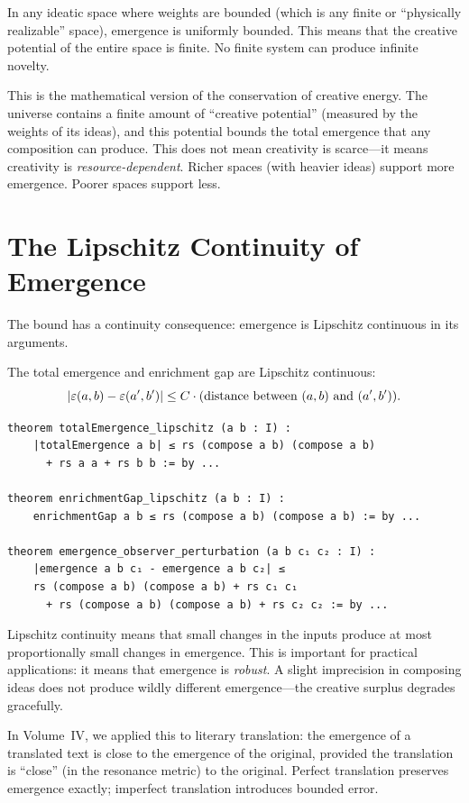 \begin{interpretation}
In any ideatic space where weights are bounded (which is any finite or
``physically realizable'' space), emergence is uniformly bounded. This means
that the creative potential of the entire space is finite. No finite system
can produce infinite novelty.

This is the mathematical version of the conservation of creative energy.
The universe contains a finite amount of ``creative potential'' (measured by
the weights of its ideas), and this potential bounds the total emergence that
any composition can produce. This does not mean creativity is scarce---it means
creativity is \emph{resource-dependent}. Richer spaces (with heavier ideas)
support more emergence. Poorer spaces support less.
\end{interpretation}


\section{The Lipschitz Continuity of Emergence}

The bound has a continuity consequence: emergence is Lipschitz continuous in
its arguments.

\begin{theorem}
\label{thm:lipschitz}
The total emergence and enrichment gap are Lipschitz continuous:
\[
  |\varepsilon(a,b) - \varepsilon(a',b')| \leq C \cdot (\text{distance between } (a,b) \text{ and } (a',b')).
\]
\end{theorem}

\begin{lstlisting}[caption={Lipschitz continuity (IDT\_v3\_Emergence.lean)}]
theorem totalEmergence_lipschitz (a b : I) :
    |totalEmergence a b| ≤ rs (compose a b) (compose a b)
      + rs a a + rs b b := by ...

theorem enrichmentGap_lipschitz (a b : I) :
    enrichmentGap a b ≤ rs (compose a b) (compose a b) := by ...

theorem emergence_observer_perturbation (a b c₁ c₂ : I) :
    |emergence a b c₁ - emergence a b c₂| ≤
    rs (compose a b) (compose a b) + rs c₁ c₁
      + rs (compose a b) (compose a b) + rs c₂ c₂ := by ...
\end{lstlisting}

\begin{interpretation}
Lipschitz continuity means that small changes in the inputs produce at most
proportionally small changes in emergence. This is important for practical
applications: it means that emergence is \emph{robust}. A slight imprecision
in composing ideas does not produce wildly different emergence---the creative
surplus degrades gracefully.

In Volume~IV, we applied this to literary translation: the emergence of a
translated text is close to the emergence of the original, provided the
translation is ``close'' (in the resonance metric) to the original. Perfect
translation preserves emergence exactly; imperfect translation introduces
bounded error.
\end{interpretation}

